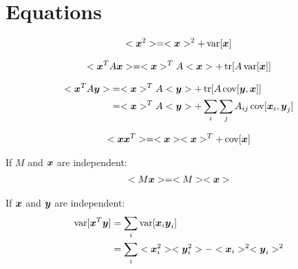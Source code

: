 \documentclass[a4paper]{article}
\begin{document}
\section{Equations}
\newcommand{\Xvx}{\bs{x}}
\newcommand{\Xvy}{\bs{y}}

\begin{align}
  \label{eq:x2}
  <\boldsymbol{x}^2>=<\boldsymbol{x}>^2+\operatorname{var}[\boldsymbol{x}]
\end{align}

\begin{align}
  \label{eq:xAx}
  <\boldsymbol{x}^T A \boldsymbol{x}>=<\boldsymbol{x}>^T A <\boldsymbol{x}> + \operatorname{tr}[A \operatorname{var}[\boldsymbol{x}]]
\end{align}

\begin{align}
  \label{eq:xAy}
  <\boldsymbol{x}^T A \boldsymbol{y}>
  &=<\boldsymbol{x}>^T A <\boldsymbol{y}> + \operatorname{tr}[A \operatorname{cov}[\boldsymbol{y},\boldsymbol{x}]] \\
  &=<\boldsymbol{x}>^T A <\boldsymbol{y}> + \sum_i\sum_j A_{ij} \operatorname{cov}[\boldsymbol{x}_i,\boldsymbol{y}_j]
\end{align}

\begin{align}
  \label{eq:xx}
  <\boldsymbol{x}\boldsymbol{x}^T>=<\boldsymbol{x}><\boldsymbol{x}>^T+ \operatorname{cov}[\boldsymbol{x}]
\end{align}

If $M$ and $\Xvx$ are independent:
\begin{align}
  \label{eq:Mx}
  <M \Xvx>=<M><\Xvx>
\end{align}

If $\Xvx$ and $\Xvy$ are independent:
\begin{align}
  \label{eq:vxy}
  \Xvar[\Xvx^T\Xvy]
  &=\sum_i \Xvar[\Xvx_i \Xvy_i] \\
  &=\sum_i <\Xvx_i^2><\Xvy_i^2> - <\Xvx_i>^2<\Xvy_i>^2 
\end{align}
\end{document}
